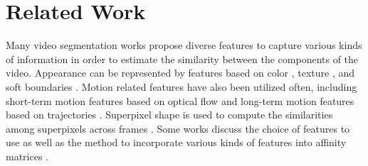 \documentclass[runningheads]{llncs}
\begin{document}



\section{Related Work}

\label{sec:rw}
 

Many video segmentation works propose diverse features to capture various kinds of information in order to estimate the similarity between the components of the video. Appearance can be represented by features based on color \cite{Grundmann:5539893,Cheng:6247744}, texture \cite{textons}, and soft boundaries \cite{Galasso_2014_CVPR}. Motion related features have also been utilized often, including short-term motion features based on optical flow \cite{conf/iccv/GalassoINC11,Tsai_2016_CVPR} and long-term motion features based on trajectories \cite{Bro10c,track_to_the_future,cPalou13,Brox:2010:OSL:1888150.1888173}. Superpixel shape is used to compute the similarities among superpixels across frames \cite{Cheng:6247744}. Some works discuss the choice of features to use \cite{Galasso2013} as well as the method to incorporate various kinds of features into affinity matrices \cite{Khoreva:7298697}.
\end{document}
